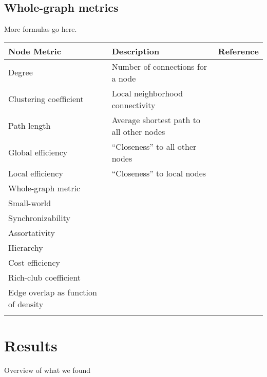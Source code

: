 \documentclass{frontiersSCNS} %
\begin{document}
\subsection{Whole-graph metrics}
More formulas go here.

\begin{table}[!t]
{\begin{tabular}{lll}
\midrule
Node Metric & Description & Reference\\\midrule
Degree & Number of connections for a node & \\
Clustering coefficient & Local neighborhood connectivity & \cite{Watts1998}\\
Path length & Average shortest path to all other nodes & \cite{Watts1998}\\
Global efficiency & ``Closeness'' to all other nodes &\cite{Latora2001}\\
Local efficiency & ``Closeness'' to local nodes & \\
\midrule
Whole-graph metric\\
\midrule
Small-world & & \cite{Watts1998}\\
Synchronizability & & \cite{Motter2005}\\
Assortativity & & \cite{Newman2002}\\
Hierarchy & & \cite{Ravasz2003}\\
Cost efficiency & &\cite{Achard2007}\\
Rich-club coefficient & & \cite{Colizza2006}\\
Edge overlap as function of density & &\\\botrule
\end{tabular}}{}
\end{table}



\section{Results}
Overview of what we found
\end{document}

